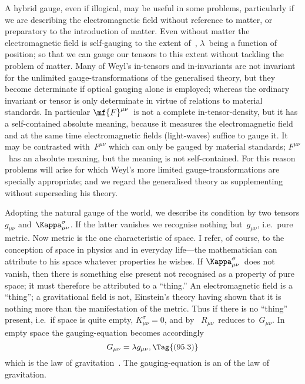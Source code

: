 \documentclass[12pt]{book}
\begin{document}
A hybrid gauge, even if illogical, may be useful in some problems, particularly
if we are describing the electromagnetic field without reference to
matter, or preparatory to the introduction of matter. Even without matter
the electromagnetic field is self\hyp{}gauging to the extent of~, $\lambda$~being a
function of position; so that we can gauge our tensors to this extent without
tackling the problem of matter. Many of Weyl's in\hyp{}tensors and in\hyp{}invariants
are not invariant for the unlimited gauge\hyp{}transformations of the generalised
theory, but they become determinate if optical gauging alone is employed;
whereas the ordinary invariant or tensor is only determinate in virtue of
relations to material standards. In particular $\mf{F}^{\mu\nu}$~is not a complete in\hyp{}tensor\hyp{}density,
but it has a self\hyp{}contained absolute meaning, because it measures the
electromagnetic field and at the same time electromagnetic fields (light\hyp{}waves)
suffice to gauge it. It may be contrasted with~$F^{\mu\nu}$ which can only be gauged
by material standards; $F^{\mu\nu}$~has an absolute meaning, but the meaning is not
self\hyp{}contained. For this reason problems will arise for which Weyl's more
limited gauge\hyp{}transformations are specially appropriate; and we regard the
generalised theory as supplementing without superseding his theory.

Adopting the natural gauge of the world, we describe its condition by
%
two tensors $g_{\mu\nu}$ and~$\Kappa_{\mu\nu}^{\sigma}$. If the latter vanishes we recognise nothing but~$g_{\mu\nu}$,
i.e.\ pure metric. Now metric is the one characteristic of space. I refer, of
%
course, to the conception of space in physics and in everyday life---the mathematician
can attribute to his space whatever properties he wishes. If $\Kappa_{\mu\nu}^{\sigma}$~does
not vanish, then there is something else present not recognised as a property
%
of pure space; it must therefore be attributed to a ``thing\footnotemark.''\footnotetext
  {An electromagnetic field is a ``thing''; a gravitational field is not, Einstein's theory having
  shown that it is nothing more than the manifestation of the metric.}
Thus if there
is no ``thing'' present, i.e.\ if space is quite empty, $K_{\mu\nu}^{\sigma} = 0$, and by~ $R_{\mu\nu}$~reduces
to~$G_{\mu\nu}$. In empty space the gauging\hyp{}equation becomes accordingly
%
\[
G_{\mu\nu} = \lambda g_{\mu\nu},
\Tag{(95.3)}
\]
which is the law of gravitation~. The gauging\hyp{}equation is an  of the
law of gravitation.
\end{document}
